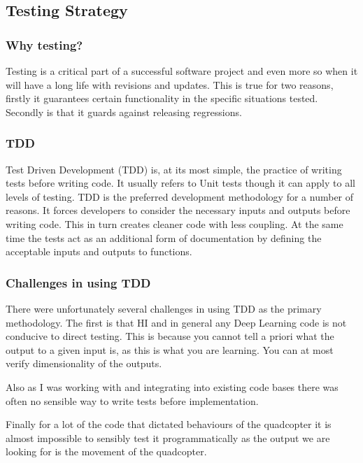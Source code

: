 \documentclass[]{../resources/final_report}
\begin{document}
\subsection{Testing Strategy}

\subsubsection{Why testing?}
Testing is a critical part of a successful software project and even more so when it will have a long life with revisions and updates. This is true for two reasons, firstly it guarantees certain functionality in the specific situations tested. Secondly is that it guards against releasing regressions.

\subsubsection{TDD}
Test Driven Development (TDD) is, at its most simple, the practice of writing tests before writing code. It usually refers to Unit tests though it can apply to all levels of testing.
TDD is the preferred development methodology for a number of reasons. It forces developers to consider the necessary inputs and outputs before writing code. This in turn creates cleaner code with less coupling. At the same time the tests act as an additional form of documentation by defining the acceptable inputs and outputs to functions.

\subsubsection{Challenges in using TDD}

There were unfortunately several challenges in using TDD as the primary methodology. The first is that HI and in general any Deep Learning code is not conducive to direct testing. This is because you cannot tell a priori what the output to a given input is, as this is what you are learning. You can at most verify dimensionality of the outputs.

Also as I was working with and integrating into existing code bases there was often no sensible way to write tests before implementation.

Finally for a lot of the code that dictated behaviours of the quadcopter it is almost impossible to sensibly test it programmatically as the output we are looking for is the movement of the quadcopter.
\end{document}

